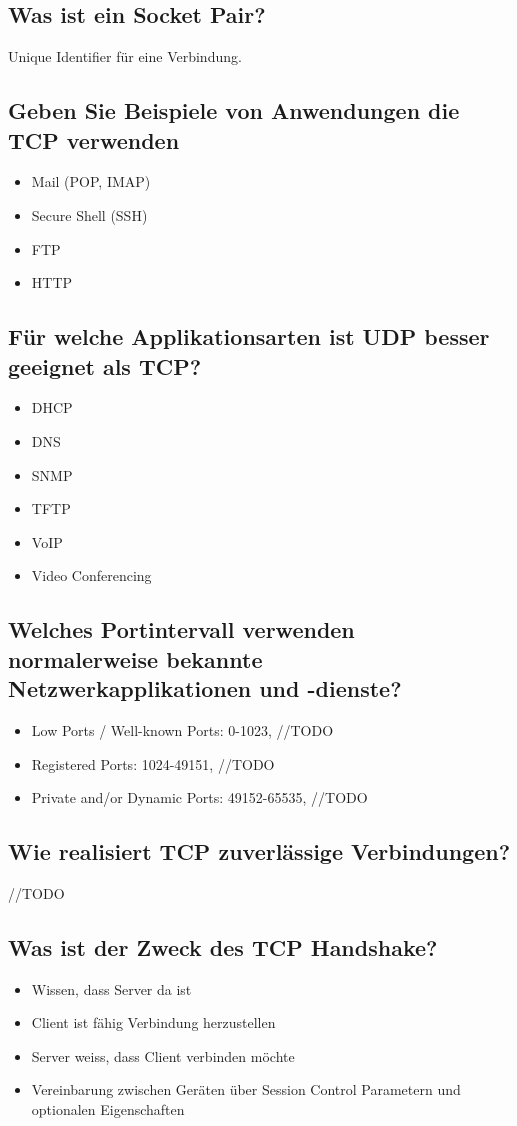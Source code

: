 \subsection*{Was ist ein \flqq{}Socket Pair\frqq?}
Unique Identifier für eine Verbindung.
\subsection*{Geben Sie Beispiele von Anwendungen die TCP verwenden}
\begin{itemize}
    \item Mail (POP, IMAP)
    \item Secure Shell (SSH)
    \item FTP
    \item HTTP
\end{itemize}
\subsection*{Für welche Applikationsarten ist UDP besser geeignet als TCP?}
\begin{itemize}
    \item DHCP
    \item DNS
    \item SNMP
    \item TFTP
    \item VoIP
    \item Video Conferencing
\end{itemize}
\subsection*{Welches Portintervall verwenden normalerweise bekannte Netzwerkapplikationen und -dienste?}
\begin{itemize}
    \item Low Ports / Well-known Ports: 0-1023, //TODO
    \item Registered Ports: 1024-49151, //TODO
    \item Private and/or Dynamic Ports: 49152-65535, //TODO
\end{itemize}
\subsection*{Wie realisiert TCP zuverlässige Verbindungen?}
//TODO
\subsection*{Was ist der Zweck des TCP Handshake?}
\begin{itemize}
    \item Wissen, dass Server da ist
    \item Client ist fähig Verbindung herzustellen
    \item Server weiss, dass Client verbinden möchte
    \item Vereinbarung zwischen Geräten über Session Control Parametern und optionalen Eigenschaften
\end{itemize}
